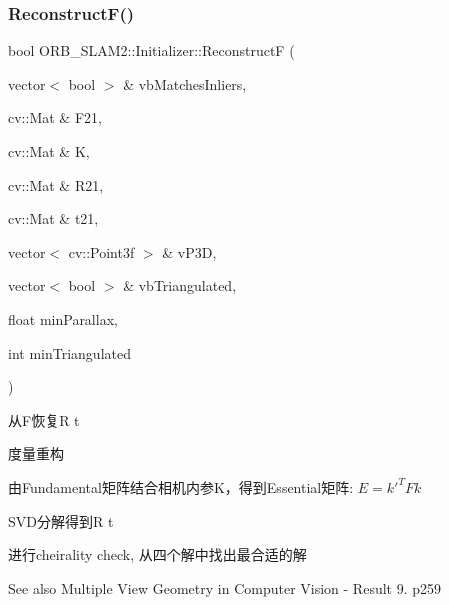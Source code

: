 \subsubsection{\texorpdfstring{Reconstruct\+F()}{ReconstructF()}}
{\footnotesize\ttfamily bool O\+R\+B\+\_\+\+S\+L\+A\+M2\+::\+Initializer\+::\+ReconstructF (\begin{DoxyParamCaption}\item[{vector$<$ bool $>$ \&}]{vb\+Matches\+Inliers,  }\item[{cv\+::\+Mat \&}]{F21,  }\item[{cv\+::\+Mat \&}]{K,  }\item[{cv\+::\+Mat \&}]{R21,  }\item[{cv\+::\+Mat \&}]{t21,  }\item[{vector$<$ cv\+::\+Point3f $>$ \&}]{v\+P3D,  }\item[{vector$<$ bool $>$ \&}]{vb\+Triangulated,  }\item[{float}]{min\+Parallax,  }\item[{int}]{min\+Triangulated }\end{DoxyParamCaption})\hspace{0.3cm}{\ttfamily [private]}}



从\+F恢复R t 

度量重构
\begin{DoxyEnumerate}
\item 由\+Fundamental矩阵结合相机内参\+K，得到\+Essential矩阵\+: $ E = k'^T F k $
\item S\+V\+D分解得到R t
\item 进行cheirality check, 从四个解中找出最合适的解
\end{DoxyEnumerate}

\begin{DoxySeeAlso}{See also}
Multiple View Geometry in Computer Vision -\/ Result 9. p259 
\end{DoxySeeAlso}
\mbox{\label{class_o_r_b___s_l_a_m2_1_1_initializer_addc1c05d3b7a5ae35805f69b50f368ea}} 
